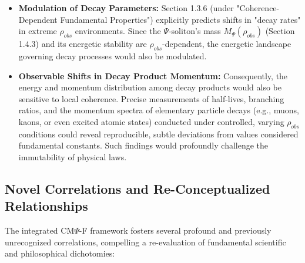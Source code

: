 \documentclass{report}
\begin{document}
\begin{itemize}
\begin{itemize}
        \item \textbf{Modulation of Decay Parameters:} Section 1.3.6 (under "Coherence-Dependent Fundamental Properties") explicitly predicts shifts in "decay rates" in extreme $\rho_{obs}$ environments. Since the $\Psi$-soliton's mass $M_\Psi(\rho_{obs})$ (Section 1.4.3) and its energetic stability are $\rho_{obs}$-dependent, the energetic landscape governing decay processes would also be modulated.
        \item \textbf{Observable Shifts in Decay Product Momentum:} Consequently, the energy and momentum distribution among decay products would also be sensitive to local coherence. Precise measurements of half-lives, branching ratios, and the momentum spectra of elementary particle decays (e.g., muons, kaons, or even excited atomic states) conducted under controlled, varying $\rho_{obs}$ conditions could reveal reproducible, subtle deviations from values considered fundamental constants. Such findings would profoundly challenge the immutability of physical laws.
    \end{itemize}
\end{itemize}

\subsection{Novel Correlations and Re-Conceptualized Relationships}
\label{subsec:new-correlations}

The integrated CM$\Psi$-F framework fosters several profound and previously unrecognized correlations, compelling a re-evaluation of fundamental scientific and philosophical dichotomies:
\end{document}
